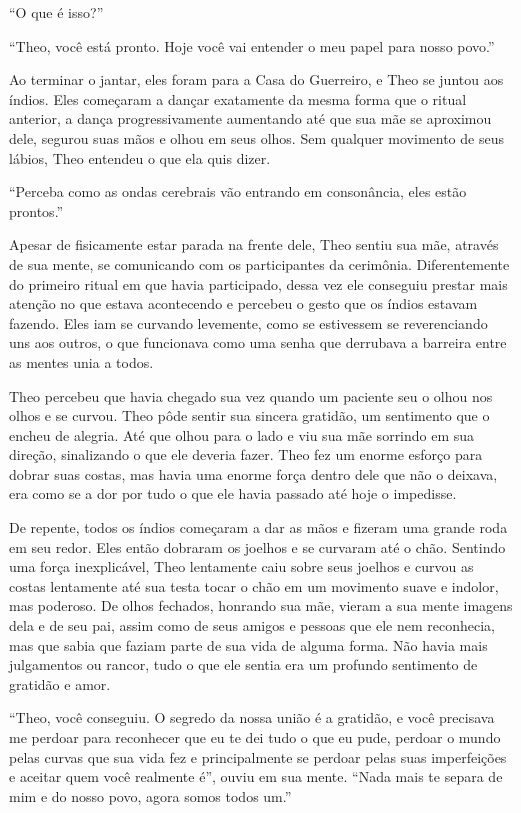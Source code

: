 ``O que é isso?''

``Theo, você está pronto. Hoje você vai entender o meu papel para nosso
povo.''

Ao terminar o jantar, eles foram para a Casa do Guerreiro, e Theo se
juntou aos índios. Eles começaram a dançar exatamente da mesma forma que
o ritual anterior, a dança progressivamente aumentando até que sua
mãe se aproximou dele, segurou suas mãos e olhou em seus olhos. Sem
qualquer movimento de seus lábios, Theo entendeu o que ela quis dizer.

``Perceba como as ondas cerebrais vão entrando em consonância, eles estão
prontos.''

Apesar de fisicamente estar parada na frente dele, Theo sentiu sua mãe,
através de sua mente, se comunicando com os participantes da cerimônia.
Diferentemente do primeiro ritual em que havia participado, dessa vez
ele conseguiu prestar mais atenção no que estava acontecendo e percebeu
o gesto que os índios estavam fazendo. Eles iam se curvando levemente,
como se estivessem se reverenciando uns aos outros, o que funcionava
como uma senha que derrubava a barreira entre as mentes unia a todos.

Theo percebeu que havia chegado sua vez quando um paciente seu o olhou
nos olhos e se curvou. Theo pôde sentir sua sincera gratidão, um
sentimento que o encheu de alegria. Até que olhou para o lado e viu sua
mãe sorrindo em sua direção, sinalizando o que ele deveria fazer. Theo
fez um enorme esforço para dobrar suas costas, mas havia uma enorme
força dentro dele que não o deixava, era como se a dor por tudo o que
ele havia passado até hoje o impedisse.

De repente, todos os índios começaram a dar as mãos e fizeram uma grande
roda em seu redor. Eles então dobraram os joelhos e se curvaram até o
chão. Sentindo uma força inexplicável, Theo lentamente caiu sobre seus
joelhos e curvou as costas lentamente até sua testa tocar o chão em um
movimento suave e indolor, mas poderoso. De olhos fechados, honrando sua
mãe, vieram a sua mente imagens dela e de seu pai, assim como de seus
amigos e pessoas que ele nem reconhecia, mas que sabia que faziam parte de
sua vida de alguma forma. Não havia mais julgamentos ou rancor, tudo o
que ele sentia era um profundo sentimento de gratidão e amor.

``Theo, você conseguiu. O segredo da nossa união é a gratidão, e você
precisava me perdoar para reconhecer que eu te dei tudo o que eu pude,
perdoar o mundo pelas curvas que sua vida fez e principalmente se
perdoar pelas suas imperfeições e aceitar quem você realmente é'', ouviu
em sua mente. ``Nada mais te separa de mim e do nosso povo, agora somos
todos um.''


